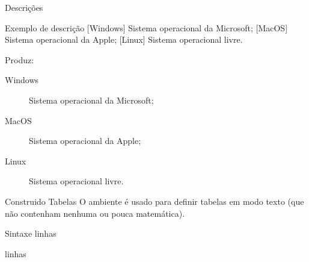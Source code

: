 \begin{frame}{Descrições}
	\begin{Codigo}{Exemplo de descrição}
		 \n
			 [Windows] Sistema operacional da Microsoft; \n
			 Sistema operacional da Apple; \n
			 Sistema operacional livre. \n
	\end{Codigo}

\pause
	Produz:

	\begin{Resultado}{}
		\begin{description}
			\item [Windows] Sistema operacional da Microsoft;
			\item [MacOS] Sistema operacional da Apple;
			\item [Linux] Sistema operacional livre.
		\end{description}
	\end{Resultado}
\end{frame}

\begin{frame}{Construido Tabelas}
	O ambiente  é usado para definir tabelas em modo texto (que não contenham nenhuma ou pouca matemática).
	
	\pause

	\begin{Codigo}{Sintaxe}
			linhas \\

			linhas \\
	\end{Codigo}
\end{frame}

